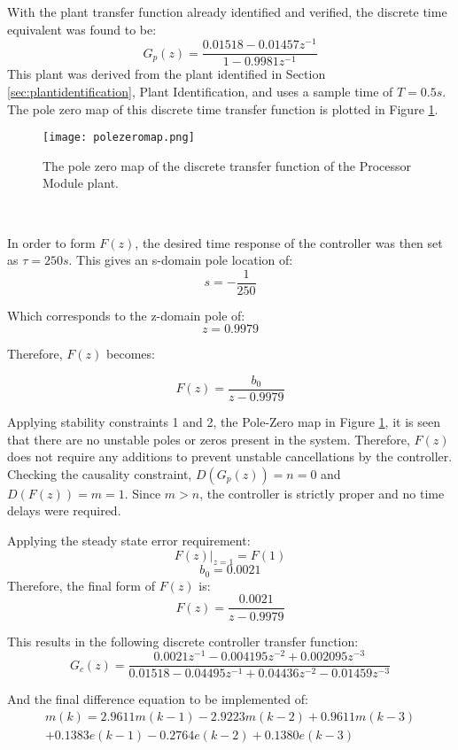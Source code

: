 With the plant transfer function already identified and verified, the discrete time equivalent was found to be:
$$ G_p(z) = \frac{0.01518 - 0.01457z^{-1}}{1 - 0.9981z^{-1}} $$
This plant was derived from the plant identified in Section \ref{sec:plantidentification}, Plant Identification, and uses a sample time of $T=0.5s$. The pole zero map of this discrete time transfer function is plotted in Figure \ref{fig:polezeromap}.

\begin{figure}[!htb]
	\centering
	\texttt{[image: polezeromap.png]}
	\caption[Discrete Plant Transfer Function Pole Zero Map.]{The pole zero map of the discrete transfer function of the Processor Module plant.}
	\label{fig:polezeromap}
\end{figure} 
\FloatBarrier

In order to form $F(z)$, the desired time response of the controller was then set as $\tau = 250s$. This gives an s-domain pole location of:
$$s=-\frac{1}{250}$$

Which corresponds to the z-domain pole of:
$$z=0.9979$$

Therefore, $F(z)$ becomes:

$$F(z) = \frac{b_0}{z - 0.9979}$$

Applying stability constraints 1 and 2, the Pole-Zero map in Figure \ref{fig:polezeromap}, it is seen that there are no unstable poles or zeros present in the system. Therefore, $F(z)$ does not require any additions to prevent unstable cancellations by the controller.\\

Checking the causality constraint, $D(G_p(z)) = n = 0$ and $D(F(z)) = m = 1$. Since $m>n$, the controller is strictly proper and no time delays were required.

Applying the steady state error requirement:
$$F(z)|_{z=1} = F(1)$$
$$b_0 = 0.0021$$
Therefore, the final form of $F(z)$ is:
$$F(z) = \frac{0.0021}{z-0.9979}$$

This results in the following discrete controller transfer function:
$$G_c(z) = \frac{0.0021z^{-1} - 0.004195z^{-2} + 0.002095z^{-3}}{0.01518 - 0.04495z^{-1} + 0.04436z^{-2} - 0.01459z^{-3}}$$

And the final difference equation to be implemented of:
\begin{equation}
\begin{split}
\label{diffeq}
	m(k) =  2.9611m(k-1) - 2.9223m(k-2) + 0.9611m(k-3)\\ + 0.1383e(k-1) - 0.2764e(k-2) + 0.1380e(k-3)
\end{split}
\end{equation}

